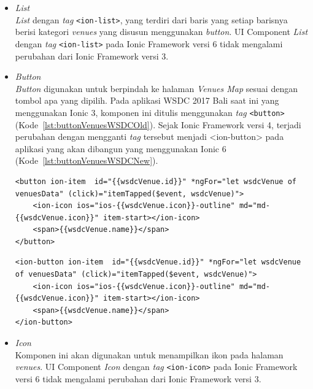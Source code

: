 \begin{enumerate}
\begin{enumerate}
\begin{itemize}
			\item \textit{List} \\
		\textit{List} dengan \textit{tag} \texttt{<ion-list>}, yang terdiri dari baris yang setiap barisnya berisi kategori \textit{venues} yang disusun menggunakan \textit{button}. UI Component \textit{List} dengan \textit{tag} \texttt{<ion-list>} pada Ionic Framework versi 6 tidak mengalami perubahan dari Ionic Framework versi 3.
		
			\item \textit{Button} \\
		\textit{Button} digunakan untuk berpindah ke halaman \textit{Venues Map} sesuai dengan tombol apa yang dipilih. Pada aplikasi WSDC 2017 Bali saat ini yang menggunakan Ionic 3, komponen ini ditulis menggunakan \textit{tag} \texttt{<button>} (Kode~\ref{lst:buttonVenuesWSDCOld}). Sejak Ionic Framework versi 4, terjadi perubahan dengan mengganti \textit{tag} tersebut menjadi {<ion-button>} pada aplikasi yang akan dibangun yang menggunakan Ionic 6 (Kode~\ref{lst:buttonVenuesWSDCNew}). 
			
		
\begin{lstlisting}[label={lst:buttonVenuesWSDCOld}, caption=\textit{Button} dengan Ionic 3 di Aplikasi WSDC 2017 Bali Saat Ini]
<button ion-item  id="{{wsdcVenue.id}}" *ngFor="let wsdcVenue of venuesData" (click)="itemTapped($event, wsdcVenue)">
	<ion-icon ios="ios-{{wsdcVenue.icon}}-outline" md="md-{{wsdcVenue.icon}}" item-start></ion-icon>
	<span>{{wsdcVenue.name}}</span>
</button>
\end{lstlisting}

\begin{lstlisting}[label={lst:buttonVenuesWSDCNew}, caption=\textit{Button} dengan Ionic 6 di Aplikasi WSDC 2017 Bali yang Akan Dibuat]
<ion-button ion-item  id="{{wsdcVenue.id}}" *ngFor="let wsdcVenue of venuesData" (click)="itemTapped($event, wsdcVenue)">
	<ion-icon ios="ios-{{wsdcVenue.icon}}-outline" md="md-{{wsdcVenue.icon}}" item-start></ion-icon>
	<span>{{wsdcVenue.name}}</span>
</ion-button>
\end{lstlisting}
		
			\item \textit{Icon} \\
		Komponen ini akan digunakan untuk menampilkan ikon pada halaman \textit{venues}. UI Component \textit{Icon} dengan \textit{tag} \texttt{<ion-icon>} pada Ionic Framework versi 6 tidak mengalami perubahan dari Ionic Framework versi 3.
		\end{itemize}	
		

\end{enumerate}
\end{enumerate}
